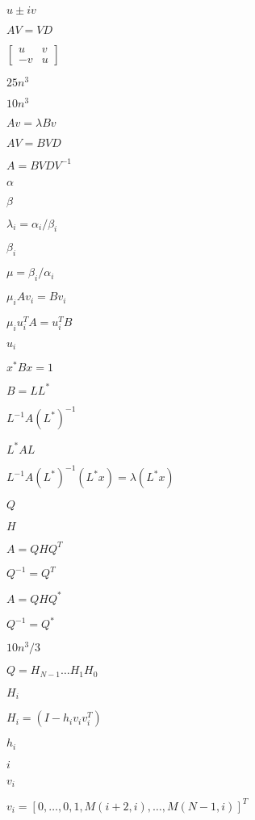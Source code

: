 \documentclass{article}
\begin{document}
$ u \pm iv $
\pagebreak

$ AV = VD $
\pagebreak

$ \begin{bmatrix} u & v \\ -v & u \end{bmatrix} $
\pagebreak

$ 25n^3 $
\pagebreak

$ 10n^3 $
\pagebreak

$ Av = \lambda Bv $
\pagebreak

$ A V = B V D $
\pagebreak

$ A = B V D V^{-1} $
\pagebreak

$ \alpha $
\pagebreak

$ \beta $
\pagebreak

$ \lambda_i = \alpha_i / \beta_i $
\pagebreak

$ \beta_i $
\pagebreak

$ \mu = \beta_i / \alpha_i$
\pagebreak

$ \mu_i A v_i = B v_i $
\pagebreak

$ \mu_i u_i^T A = u_i^T B $
\pagebreak

$ u_i $
\pagebreak

$ x^* B x = 1 $
\pagebreak

$ B = LL^* $
\pagebreak

$ L^{-1} A (L^*)^{-1} $
\pagebreak

$ L^{*} A L $
\pagebreak

$ L^{-1} A (L^*)^{-1} (L^* x) = \lambda (L^* x) $
\pagebreak

$ Q $
\pagebreak

$ H $
\pagebreak

$ A = Q H Q^T $
\pagebreak

$ Q^{-1} = Q^T $
\pagebreak

$ A = Q H Q^* $
\pagebreak

$ Q^{-1} = Q^* $
\pagebreak

$ 10n^3/3 $
\pagebreak

$ Q = H_{N-1} \ldots H_1 H_0 $
\pagebreak

$ H_i $
\pagebreak

$ H_i = (I - h_i v_i v_i^T) $
\pagebreak

$ h_i $
\pagebreak

$ i $
\pagebreak

$ v_i $
\pagebreak

$ v_i = [ 0, \ldots, 0, 1, M(i+2,i), \ldots, M(N-1,i) ]^T $
\pagebreak
\end{document}

